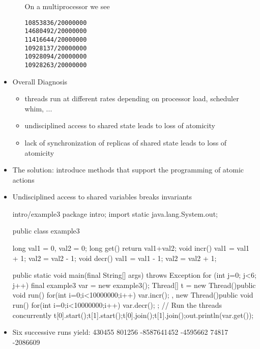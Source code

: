 \documentclass{concdistfoils}
\begin{document}
\begin{slide}
\begin{itemize}
\begin{itemize}
\begin{note}
On a multiprocessor we see
\begin{verbatim}
10853836/20000000
14680492/20000000
11416644/20000000
10928137/20000000
10928094/20000000
10928263/20000000
\end{verbatim}
\end{note}
\end{itemize}
\vfill
\item Overall Diagnosis
\begin{itemize}
\item threads run at different rates depending on processor load, scheduler whim, ...
\item undisciplined access to shared state leads to loss of atomicity
\item lack of synchronization of replicas of shared state leads to loss of atomicity
\end{itemize}
\vfill
\item The solution: introduce methods that support the programming of atomic actions
\end{itemize}
\end{slide}

\begin{slide}
\begin{smaller}
\begin{itemize}
\item Undisciplined access to shared variables breaks invariants
\begin{hideclass}{intro/example3}
package intro;
import static java.lang.System.out;
\end{hideclass}
\begin{class}{}
public class example3
{long val1 = 0, val2 = 0;
 long get()        { return val1+val2; }
 void incr()       { val1 = val1 + 1; val2 = val2 - 1; }
 void decr()       { val1 = val1 - 1; val2 = val2 + 1; }
 
 public static void main(final String[] args) throws Exception
 { for (int j=0; j<6; j++) 
   {final example3 var = new example3();
    Thread[] t = 
    { new Thread(){public void run(){ for(int i=0;i<10000000;i++) var.incr();}}
    , new Thread(){public void run(){ for(int i=0;i<10000000;i++) var.decr();}}
    };
    // Run the threads concurrently
    t[0].start();t[1].start();t[0].join();t[1].join();out.println(var.get());
   }
 }
}
\end{class}
\item Six successive runs yield: 430455 801256 -8587641452 -4595662 74817 -2086609
\end{itemize}
\end{smaller}
\end{slide}
\end{document}
